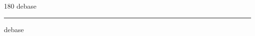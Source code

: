 
\begin{frame}
\begin{center}
\begin{turn}{180}
{\fontsize{2.5cm}{1em}\selectfont debase}
\end{turn}
\vspace{1em}\par  
\hrule
\vspace{1em}\par  
{\fontsize{2.5cm}{1em}\selectfont debase}
\end{center}
\end{frame}
